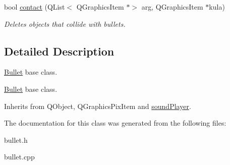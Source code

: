 \begin{DoxyCompactItemize}
\mbox{\label{classBullet_a394d03770cab61762a5928e54a08174a}} 
bool \hyperlink{classBullet_a394d03770cab61762a5928e54a08174a}{contact} (Q\+List$<$ Q\+Graphics\+Item $\ast$$>$ arg, Q\+Graphics\+Item $\ast$kula)
\begin{DoxyCompactList}\small\item\em Deletes objects that collide with bullets. \end{DoxyCompactList}\end{DoxyCompactItemize}


\subsection{Detailed Description}
\hyperlink{classBullet}{Bullet} base class. 

\hyperlink{classBullet}{Bullet} base class.

Inherits from Q\+Object, Q\+Graphics\+Pix\+Item and \hyperlink{classsoundPlayer}{sound\+Player}. 

The documentation for this class was generated from the following files\+:\begin{DoxyCompactItemize}
\item 
bullet.\+h\item 
bullet.\+cpp\end{DoxyCompactItemize}
